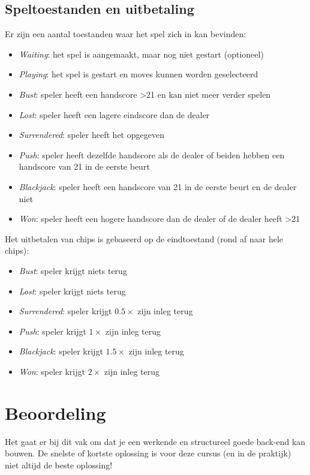 \subsection{Speltoestanden en uitbetaling}
Er zijn een aantal toestanden waar het spel zich in kan bevinden:
\begin{itemize}
    \item \textit{Waiting}: het spel is aangemaakt, maar nog niet gestart (optioneel)
    \item \textit{Playing}: het spel is gestart en moves kunnen worden geselecteerd
    \item \textit{Bust}: speler heeft een handscore >21 en kan niet meer verder spelen
    \item \textit{Lost}: speler heeft een lagere eindscore dan de dealer
    \item \textit{Surrendered}: speler heeft het opgegeven
    \item \textit{Push}: speler heeft dezelfde handscore als de dealer of beiden hebben een handscore van 21 in de eerste beurt
    \item \textit{Blackjack}: speler heeft een handscore van 21 in de eerste beurt en de dealer niet
    \item \textit{Won}: speler heeft een hogere handscore dan de dealer of de dealer heeft >21
\end{itemize}

Het uitbetalen van chips is gebaseerd op de eindtoestand (rond af naar hele chips):
\begin{itemize}
    \item \textit{Bust}: speler krijgt niets terug
    \item \textit{Lost}: speler krijgt niets terug
    \item \textit{Surrendered}: speler krijgt $0.5\times$ zijn inleg terug
    \item \textit{Push}: speler krijgt $1\times$ zijn inleg terug
    \item \textit{Blackjack}: speler krijgt $1.5\times$ zijn inleg terug
    \item \textit{Won}: speler krijgt $2\times$ zijn inleg terug
\end{itemize}

\newpage

\section{Beoordeling}
Het gaat er bij dit vak om dat je een werkende en structureel goede back-end kan bouwen.
De snelste of kortste oplossing is voor deze cursus (en in de praktijk) niet altijd de beste oplossing!


